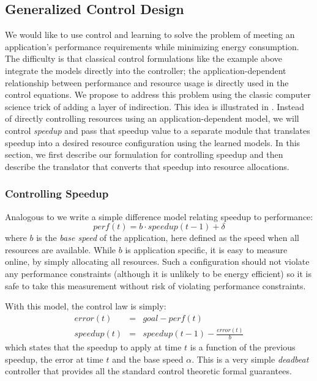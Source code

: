 \subsection{Generalized Control Design}
We would like to use control and learning to solve the problem of
meeting an application's performance requirements while minimizing
energy consumption.  The difficulty is that classical control
formulations like the example above integrate the models directly into
the controller; \ie the application-dependent relationship between
performance and resource usage is directly used in the control
equations.  We propose to address this problem using the classic
computer science trick of adding a layer of indirection.  This idea is
illustrated in .  Instead of directly controlling
resources using an application-dependent model, we will control
\emph{speedup} and pass that speedup value to a separate module that
translates speedup into a desired resource configuration using the
learned models.  In this section, we first describe our formulation
for controlling speedup and then describe the translator that converts
that speedup into resource allocations.

\subsubsection{Controlling Speedup}
Analogous to  we write a simple difference model
relating speedup to performance:
\begin{equation}
  perf(t) = b \cdot speedup(t-1) + \delta \label{eqn:speedup}
\end{equation}
where $b$ is the \emph{base speed} of the application, here defined as
the speed when all resources are available.  While $b$ is application
specific, it is easy to measure online, by simply allocating all
resources. Such a configuration should not violate any performance
constraints (although it is unlikely to be energy efficient) so it is
safe to take this measurement without risk of violating performance
constraints.

With this model, the control law is simply:
\begin{eqnarray}
  error(t) &=& goal - perf(t) \label{eqn:speedup-error} \\
  speedup(t) &=& speedup(t-1) - \frac{error(t)}{b}
  \label{eqn:speedup-control}
\end{eqnarray}
which states that the speedup to apply at time $t$ is a function of
the previous speedup, the error at time $t$ and the base speed $\alpha$.
This is a very simple \emph{deadbeat}  controller that provides
all the standard control theoretic formal guarantees.

